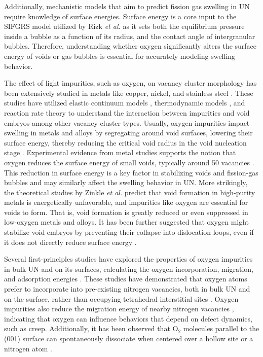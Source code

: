 \documentclass[preprint,12pt,sort&compress]{elsarticle}
\newcommand{\?}{\stackrel{?}{=}}
\begin{document}
Additionally, mechanistic models that aim to predict fission gas swelling in UN require knowledge of surface energies. Surface energy is a core input to the SIFGRS model utilized by Rizk \textit{et al.} \cite{Rizk2025} as it sets both the equilibrium pressure inside a bubble as a function of its radius, and the contact angle of intergranular bubbles. Therefore, understanding whether oxygen significantly alters the surface energy of voids or gas bubbles is essential for accurately modeling swelling behavior.

The effect of light impurities, such as oxygen, on vacancy cluster morphology has been extensively studied in metals like copper, nickel, and stainless steel \cite{Zinkle1987a, Zinkle1987b, Zinkle1990, Igata1998}. These studies have utilized elastic continuum models \cite{Zinkle1987a, Zinkle1987b}, thermodynamic models \cite{Zinkle1990}, and reaction rate theory \cite{Igata1998} to understand the interaction between impurities and void embryos among other vacancy cluster types. Usually, oxygen impurities impact swelling in metals and alloys by segregating around void surfaces, lowering their surface energy, thereby reducing the critical void radius in the void nucleation stage \cite{Zinkle1987a, Igata1998}. Experimental evidence from metal studies supports the notion that oxygen reduces the surface energy of small voids, typically around 50 vacancies \cite{Zinkle1990}. This reduction in surface energy is a key factor in stabilizing voids and fission-gas bubbles and may similarly affect the swelling behavior in UN. More strikingly, the theoretical studies by Zinkle \textit{et al.} \cite{Zinkle1987a, Zinkle1987b} predict that void formation in high-purity metals is energetically unfavorable, and impurities like oxygen are essential for voids to form. That is, void formation is greatly reduced or even suppressed in low-oxygen metals and alloys. It has been further suggested that oxygen might stabilize void embryos by preventing their collapse into dislocation loops, even if it does not directly reduce surface energy \cite{Zinkle1987b, Zinkle1990}.

Several first-principles studies have explored the properties of oxygen impurities in bulk UN and on its surfaces, calculating the oxygen incorporation, migration, and adsorption energies \cite{Kotomin2008, Kotomin2009, Zhukovskii2009JNM, Zhukovskii2009SS, Bocharov2011JNM, Bocharov2011SS, Bocharov2013, Lopes2016, Schuler2017, Zergoug2018, Sikorski2021}. These studies have demonstrated that oxygen atoms prefer to incorporate into pre-existing nitrogen vacancies, both in bulk UN and on the surface, rather than occupying tetrahedral interstitial sites \cite{Kotomin2008, Bocharov2013}. Oxygen impurities also reduce the migration energy of nearby nitrogen vacancies \cite{Kotomin2009}, indicating that oxygen can influence behaviors that depend on defect dynamics, such as creep. Additionally, it has been observed that O$_2$ molecules parallel to the (001) surface can spontaneously dissociate when centered over a hollow site or a nitrogen atom \cite{Zhukovskii2009JNM}.
\end{document}

